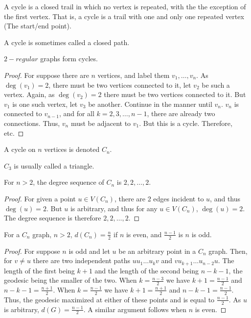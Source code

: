         \begin{definition}
        A cycle is a closed trail in which no vertex is repeated, with the the exception of the first vertex. That is, a cycle is a trail with one and only one repeated vertex (The start/end point).
        \end{definition}
        A cycle is sometimes called a closed path.
        \begin{theorem}
        $2-regular$ graphs form cycles.
        \end{theorem}
        \begin{proof}
        For suppose there are $n$ vertices, and label them $v_1,\hdots, v_n$. As $\deg(v_1)=2$, there must be two vertices connected to it, let $v_2$ be such a vertex. Again, as $\deg(v_2)=2$ there must be two vertices connected to it. But $v_1$ is one such vertex, let $v_3$ be another. Continue in the manner until $v_n$. $v_n$ is connected to $v_{n-1}$, and for all $k=2,3,\hdots, n-1$, there are already two connections. Thus, $v_n$ must be adjacent to $v_1$. But this is a cycle. Therefore, etc.
        \end{proof}
        \begin{definition}
        A cycle on $n$ vertices is denoted $C_n$.
        \end{definition}
        $C_3$ is usually called a triangle.
        \begin{theorem}
        For $n>2$, the degree sequence of $C_n$ is $2,2,\hdots, 2$.
        \end{theorem}
        \begin{proof}
        For given a point $u\in V(C_n)$, there are 2 edges incident to $u$, and thus $\deg(u) = 2$. But $u$ is arbitrary, and thus for any $u\in V(C_n)$, $\deg(u) = 2$. The degree sequence is therefore $2,2,\hdots, 2$.
        \end{proof}
        \begin{theorem}
        For a $C_n$ graph, $n>2$, $d(C_n) = \frac{n}{2}$ if $n$ is even, and $\frac{n-1}{2}$ is $n$ is odd.
        \end{theorem}
        \begin{proof}
        For suppose $n$ is odd and let $u$ be an arbitrary point in a $C_n$ graph. Then, for $v\ne u$ there are two independent paths $uu_1\hdots u_k v$ and $vu_{k+1}\hdots u_{n-2}u$. The length of the first being $k+1$ and the length of the second being $n-k-1$, the geodesic being the smaller of the two. When $k= \frac{n-3}{2}$ we have $k+1 = \frac{n-1}{2}$ and $n-k-1 = \frac{n+1}{2}$. When $k=\frac{n-1}{2}$ we have $k+1 = \frac{n+1}{2}$ and $n-k-1 = \frac{n-1}{2}$. Thus, the geodesic maximized at either of these points and is equal to $\frac{n-1}{2}$. As $u$ is arbitrary, $d(G) = \frac{n-1}{2}$. A similar argument follows when $n$ is even.
        \end{proof}

